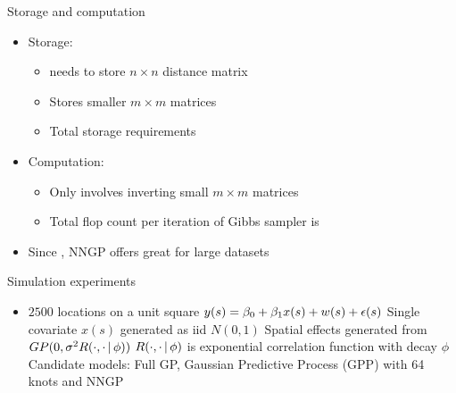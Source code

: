 \begin{frame}{Storage and computation}
	\begin{itemize}\setlength{\itemsep}{0.4cm}
		\item Storage:
		\begin{itemize}
			\item {} needs to store $n \times n$ distance matrix 
			\item Stores smaller $m \times m$ matrices %
			\item Total storage requirements 
		\end{itemize}
		\item Computation:
		\begin{itemize}
			\item Only involves inverting small $m \times m $ matrices
			\item Total flop count per iteration of Gibbs sampler is  
		\end{itemize}
	\item Since , NNGP offers great  for large datasets
	\end{itemize}
\end{frame}


\begin{frame}{Simulation experiments}
	\begin{itemize}
		\item $2500$ locations on a unit square \vskip 2mm
		\myitem $y(s) = \beta_0 + \beta_1 x(s) + w(s) + \epsilon(s)$ \vskip 2mm
		\myitem Single covariate $x(s)$ generated as iid $N(0,1)$ \vskip 2mm
		\myitem Spatial effects generated from $GP(0, \sigma^2 R(\cdot, \cdot \,|\, \phi))$ \vskip 2mm
		\myitem $R(\cdot,\cdot \,|\, \phi)$ is exponential correlation function with decay $\phi$ \vskip 2mm
		\myitem Candidate models: Full GP, Gaussian Predictive Process (GPP) with 64 knots and NNGP \vskip 2mm
	\end{itemize}
\end{frame}

